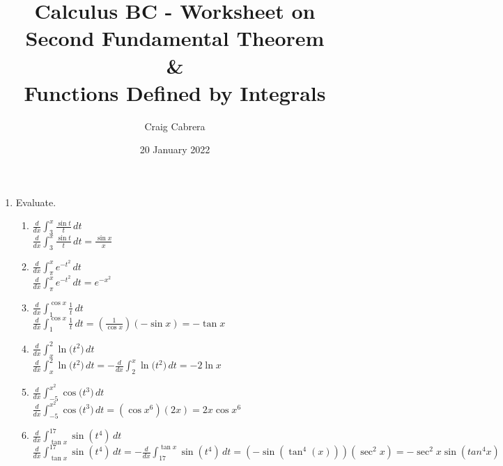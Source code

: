 \documentclass[10pt, letterpaper]{report}
\title{Calculus BC - Worksheet on Second Fundamental Theorem \\ \& \\ Functions Defined by Integrals}
\author{Craig Cabrera}
\date{20 January 2022}
\begin{document}
\maketitle
\begin{enumerate}
  \item{Evaluate.}
  \begin{enumerate}
    \item{$\frac{d}{dx}\int_{3}^{x}{\frac{\sin{t}}{t}}\,dt$} \\

      $\frac{d}{dx}\int_{3}^{x}{\frac{\sin{t}}{t}}\,dt=
      \frac{\sin{x}}{x}$ \\

    \item{$\frac{d}{dx}\int_{\pi}^{x}{e^{-t^{2}}}\,dt$} \\

      $\frac{d}{dx}\int_{\pi}^{x}{e^{-t^{2}}}\,dt=
      e^{-x^{2}}$ \\

    \item{$\frac{d}{dx}\int_{1}^{\cos{x}}{\frac{1}{t}}\,dt$} \\

      $\frac{d}{dx}\int_{1}^{\cos{x}}{\frac{1}{t}}\,dt=
      \left( \frac{1}{\cos{x}}\right)\left( -\sin{x}\right)=
      -\tan{x}$ \\

    \item{$\frac{d}{dx}\int_{x}^{2}{\ln{(t^{2}})}\,dt$} \\

      $\frac{d}{dx}\int_{x}^{2}{\ln{(t^{2}})}\,dt =
      -\frac{d}{dx}\int_{2}^{x}{\ln{(t^{2}})}\,dt =
      -2\ln{x}$ \\

    \item{$\frac{d}{dx}\int_{-5}^{x^{2}}{\cos{(t^{3}})}\,dt$} \\

      $\frac{d}{dx}\int_{-5}^{x^{2}}{\cos{(t^{3}})}\,dt=
      \left( \cos{x^{6} }\right) \left( 2x \right)=
      2x\cos{x^{6}}$ \\

    \item{$\frac{d}{dx}\int_{\tan{x}}^{17}{\sin{(t^{4})}}\,dt$} \\

      $\frac{d}{dx}\int_{\tan{x}}^{17}{\sin{(t^{4})}}\,dt=
      -\frac{d}{dx}\int_{17}^{\tan{x}}{\sin{(t^{4})}}\,dt=
      \left( -\sin{(\tan^{4}{(x)})} \right)\left( \sec^{2}{x} \right)=
      -\sec^{2}{x}\sin{(tan^{4}{x})}$ \\


\end{enumerate}
\end{enumerate}
\end{document}
